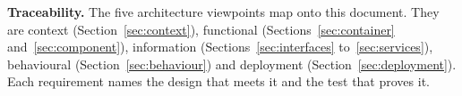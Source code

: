 \textbf{Traceability.} The five architecture viewpoints map onto this document.
They are context (Section~\ref{sec:context}), functional (Sections~\ref{sec:container} and~\ref{sec:component}), information
(Sections~\ref{sec:interfaces} to~\ref{sec:services}), behavioural (Section~\ref{sec:behaviour}) and deployment (Section~\ref{sec:deployment}). Each requirement names the
design that meets it and the test that proves it.
